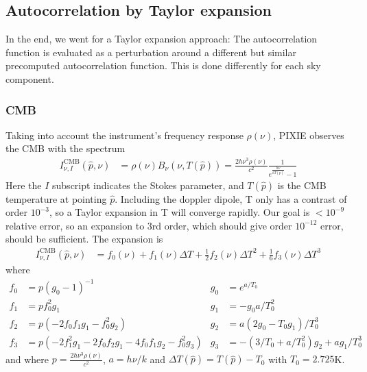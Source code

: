 \documentclass{article}
\begin{document}
\subsection{Autocorrelation by Taylor expansion}
In the end, we went for a Taylor expansion approach: The autocorrelation function
is evaluated as a perturbation around a different but similar
precomputed autocorrelation function. This is done differently for each sky component.

\subsubsection{CMB}
Taking into account the instrument's frequency response $\rho(\nu)$, PIXIE
observes the CMB with the spectrum
\begin{align}
I^\textrm{CMB}_{\nu,I}(\hat p, \nu) &= \rho(\nu)B_\nu(\nu, T(\hat p)) = \frac{2h\nu^3\rho(\nu)}{c^2}\frac{1}{e^{\frac{h\nu}{kT(\hat p)}} - 1}
\end{align}
Here the $I$ subscript indicates the Stokes parameter, and $T(\hat p)$ is the
CMB temperature at pointing $\hat p$.
Including the doppler dipole, T only has a contrast of order $10^{-3}$, so a Taylor
expansion in T will converge rapidly. Our goal is $<10^{-9}$ relative error, so an
expansion to 3rd order, which should give order $10^{-12}$ error, should be sufficient.
The expansion is
\begin{align}
	I^\textrm{CMB}_{\nu,I}(\hat p, \nu) &= f_0(\nu) + f_1(\nu) \Delta T + \frac12 f_2(\nu) \Delta T^2 + \frac16 f_3(\nu) \Delta T^3
\end{align}
where
\begin{align*}
	f_0 &= p(g_0-1)^{-1}    & g_0 &= e^{a/T_0} \\
	f_1 &= pf_0^2 g_1       & g_1 &= -g_0 a/T_0^2 \\
	f_2 &= p(-2 f_0 f_1 g_1 - f_0^2 g_2) &
	g_2 &= a(2 g_0-T_0 g_1)/T_0^3 \\
	f_3 &= p(-2 f_1^2 g_1 - 2f_0 f_2 g_1 - 4 f_0 f_1 g_2 - f_0^2 g_3) &
	g_3 &= -(3/T_0 + a/T_0^2)g_2 + a g_1/T_0^3
\end{align*}
and where $p = \frac{2h\nu^3\rho(\nu)}{c^2}$, $a = h\nu/k$ and $\Delta T(\hat p) = T(\hat p)-T_0$ with $T_0 = 2.725$K. 
\end{document}
